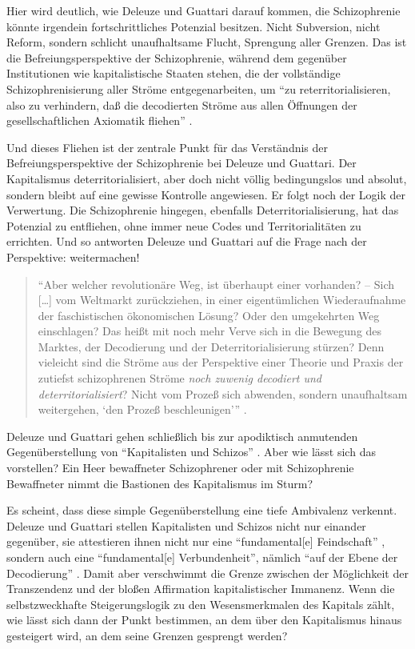 \documentclass[12pt,
               paper=a4,
               twoside=false,
               onehalfspacing,
               bibliography=totoc,
               toc=graduated,
               ]{scrartcl}
\newcommand{\lips}{\dots\unkern}
\newcommand{\pc}[2]{\parencite[#1]{#2}}
\newcommand{\worries}[1]{\ifdraft{\textcolor{blue}{\texttt{(#1)}}}{}}
\newcommand{\dg}{Deleuze und Guattari\xspace}
\begin{document}
Hier wird deutlich, wie \dg darauf kommen, die Schizophrenie könnte
irgendein fortschrittliches Potenzial besitzen. Nicht Subversion,
nicht Reform, sondern schlicht unaufhaltsame Flucht, Sprengung aller
Grenzen. Das ist die Befreiungsperspektive der Schizophrenie, während
dem gegenüber Institutionen wie kapitalistische Staaten stehen, die
der vollständige Schizophrenisierung aller Ströme entgegenarbeiten, um
"`zu reterritorialisieren, also zu verhindern, daß die decodierten
Ströme aus allen Öffnungen der gesellschaftlichen Axiomatik fliehen"'
\pc{332}{ao}.

Und dieses Fliehen ist der zentrale Punkt für das Verständnis der
Befreiungsperspektive der Schizophrenie bei Deleuze und Guattari. Der
Kapitalismus deterritorialisiert, aber doch nicht völlig bedingungslos
und absolut, sondern bleibt auf eine gewisse Kontrolle angewiesen. Er
folgt noch der Logik der Verwertung. Die Schizophrenie hingegen,
ebenfalls Deterritorialisierung, hat das Potenzial zu entfliehen, ohne
immer neue Codes und Territorialitäten zu errichten. Und so antworten
Deleuze und Guattari auf die Frage nach der Perspektive: weitermachen!
%
\begin{spacing}{1}
\begin{quote}
\enquote{Aber welcher revolutionäre Weg, ist
überhaupt einer vorhanden? -- Sich [\lips] vom Weltmarkt zurückziehen,
in einer eigentümlichen Wiederaufnahme der faschistischen \glq
ökonomischen Lösung\grq? Oder den umgekehrten Weg einschlagen? Das
heißt mit noch mehr Verve sich in die Bewegung des Marktes, der
Decodierung und der Deterritorialisierung stürzen? Denn vieleicht sind
die Ströme aus der Perspektive einer Theorie und Praxis der
zutiefst schizophrenen Ströme \emph{noch zuwenig decodiert und
deterritorialisiert}? Nicht vom Prozeß sich abwenden, sondern
unaufhaltsam weitergehen, \enquote{den Prozeß beschleunigen}}
\pc{S. 308, meine Hervorh.}{ao}.
\end{quote}
\end{spacing}

\dg gehen schließlich bis zur apodiktisch anmutenden Gegenüberstellung
von "`Kapitalisten und Schizos"' \pc{328}{ao}. Aber wie lässt sich das
vorstellen? Ein Heer bewaffneter Schizophrener oder mit Schizophrenie
Bewaffneter nimmt die Bastionen des Kapitalismus im Sturm?

Es scheint, dass diese simple Gegenüberstellung eine tiefe Ambivalenz
verkennt. \dg stellen Kapitalisten und Schizos nicht nur einander
gegenüber, sie attestieren ihnen nicht nur eine "`fundamental[e]
Feindschaft"' \pc{328}{ao}, sondern auch eine "`fundamental[e]
Verbundenheit"', nämlich "`auf der Ebene der Decodierung"'
\pc{328}{ao}. Damit aber verschwimmt die Grenze zwischen der
Möglichkeit der Transzendenz und der bloßen Affirmation
kapitalistischer Immanenz.
Wenn die selbstzweckhafte Steigerungslogik zu den Wesensmerkmalen des
Kapitals zählt, wie lässt sich dann der Punkt bestimmen, an dem über
den Kapitalismus hinaus gesteigert wird, an dem seine Grenzen
gesprengt werden?
\end{document}
